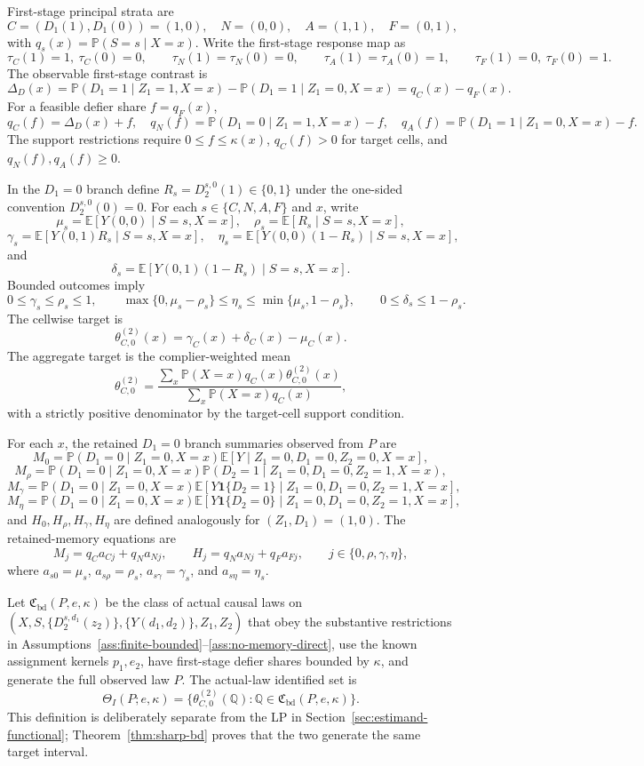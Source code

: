 \documentclass[11pt]{article}
\newcommand{\E}{\mathbb{E}}
\renewcommand{\Pr}{\mathbb{P}}
\newcommand{\one}{\mathbf{1}}
\theoremstyle{definition}
\theoremstyle{plain}
\theoremstyle{remark}
\begin{document}
First-stage principal strata are
\[
C=(D_1(1),D_1(0))=(1,0),\quad
N=(0,0),\quad
A=(1,1),\quad
F=(0,1),
\]
with \(q_s(x)=\Pr(S=s\mid X=x)\).
Write the first-stage response map as
\[
\tau_C(1)=1,\ \tau_C(0)=0,\qquad
\tau_N(1)=\tau_N(0)=0,\qquad
\tau_A(1)=\tau_A(0)=1,\qquad
\tau_F(1)=0,\ \tau_F(0)=1.
\]
The observable first-stage contrast is
\[
\Delta_D(x)=\Pr(D_1=1\mid Z_1=1,X=x)-\Pr(D_1=1\mid Z_1=0,X=x)=q_C(x)-q_F(x).
\]
For a feasible defier share \(f=q_F(x)\),
\[
q_C(f)=\Delta_D(x)+f,\quad
q_N(f)=\Pr(D_1=0\mid Z_1=1,X=x)-f,\quad
q_A(f)=\Pr(D_1=1\mid Z_1=0,X=x)-f.
\]
The support restrictions require \(0\le f\le\kappa(x)\), \(q_C(f)>0\) for target cells, and \(q_N(f),q_A(f)\ge0\).

In the \(D_1=0\) branch define \(R_s=D_2^{s,0}(1)\in\{0,1\}\) under the one-sided convention \(D_2^{s,0}(0)=0\).
For each \(s\in\{C,N,A,F\}\) and \(x\), write
\[
\mu_s=\E[Y(0,0)\mid S=s,X=x],\quad
\rho_s=\E[R_s\mid S=s,X=x],
\]
\[
\gamma_s=\E[Y(0,1)R_s\mid S=s,X=x],\quad
\eta_s=\E[Y(0,0)(1-R_s)\mid S=s,X=x],
\]
and
\[
\delta_s=\E[Y(0,1)(1-R_s)\mid S=s,X=x].
\]
Bounded outcomes imply
\[
0\le\gamma_s\le\rho_s\le1,\qquad
\max\{0,\mu_s-\rho_s\}\le\eta_s\le\min\{\mu_s,1-\rho_s\},\qquad
0\le\delta_s\le1-\rho_s.
\]
The cellwise target is
\[
\theta_{C,0}^{(2)}(x)=\gamma_C(x)+\delta_C(x)-\mu_C(x).
\]
The aggregate target is the complier-weighted mean
\[
\theta_{C,0}^{(2)}
=\frac{\sum_x \Pr(X=x)q_C(x)\theta_{C,0}^{(2)}(x)}
{\sum_x \Pr(X=x)q_C(x)},
\]
with a strictly positive denominator by the target-cell support condition.

For each \(x\), the retained \(D_1=0\) branch summaries observed from \(P\) are
\[
M_0=\Pr(D_1=0\mid Z_1=0,X=x)\E[Y\mid Z_1=0,D_1=0,Z_2=0,X=x],
\]
\[
M_\rho=\Pr(D_1=0\mid Z_1=0,X=x)\Pr(D_2=1\mid Z_1=0,D_1=0,Z_2=1,X=x),
\]
\[
M_\gamma=\Pr(D_1=0\mid Z_1=0,X=x)
\E[Y\one\{D_2=1\}\mid Z_1=0,D_1=0,Z_2=1,X=x],
\]
\[
M_\eta=\Pr(D_1=0\mid Z_1=0,X=x)
\E[Y\one\{D_2=0\}\mid Z_1=0,D_1=0,Z_2=1,X=x],
\]
and \(H_0,H_\rho,H_\gamma,H_\eta\) are defined analogously for \((Z_1,D_1)=(1,0)\).
The retained-memory equations are
\[
M_j=q_C a_{Cj}+q_N a_{Nj},\qquad
H_j=q_N a_{Nj}+q_F a_{Fj},\qquad
j\in\{0,\rho,\gamma,\eta\},
\]
where \(a_{s0}=\mu_s\), \(a_{s\rho}=\rho_s\), \(a_{s\gamma}=\gamma_s\), and \(a_{s\eta}=\eta_s\).

Let \(\mathfrak C_{\mathrm{bd}}(P,e,\kappa)\) be the class of actual causal laws on \((X,S,\{D_2^{s,d_1}(z_2)\},\{Y(d_1,d_2)\},Z_1,Z_2)\) that obey the substantive restrictions in Assumptions~\ref{ass:finite-bounded}--\ref{ass:no-memory-direct}, use the known assignment kernels \(p_1,e_2\), have first-stage defier shares bounded by \(\kappa\), and generate the full observed law \(P\).
The actual-law identified set is
\[
\Theta_I(P;e,\kappa)=
\{\theta_{C,0}^{(2)}(\mathbb Q):\mathbb Q\in\mathfrak C_{\mathrm{bd}}(P,e,\kappa)\}.
\]
This definition is deliberately separate from the LP in Section~\ref{sec:estimand-functional}; Theorem~\ref{thm:sharp-bd} proves that the two generate the same target interval.
\end{document}
